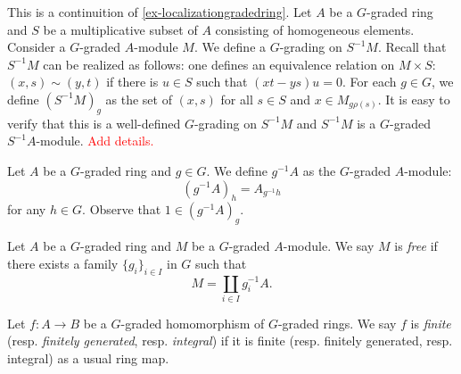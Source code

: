\begin{example}\label{ex-localizationgradedmodule}
    This is a continuition of \cref{ex-localizationgradedring}.
    Let $A$ be a $G$-graded ring and $S$ be a multiplicative subset of $A$ consisting of homogeneous elements. Consider a $G$-graded $A$-module $M$. We define a $G$-grading on $S^{-1}M$. Recall that $S^{-1}M$ can be realized as follows: one defines an equivalence relation on $M\times S$: $(x,s)\sim (y,t)$ if there is $u\in S$ such that $(xt-ys)u=0$. For each $g\in G$, we define $(S^{-1}M)_g$ as the set of $(x,s)$ for all $s\in S$ and $x\in M_{g\rho(s)}$. It is easy to verify that this is a well-defined $G$-grading on $S^{-1}M$ and $S^{-1}M$ is a $G$-graded $S^{-1}A$-module.  \textcolor{red}{Add details.}
\end{example}

\begin{example}\label{ex-twistmodule}
    Let $A$ be a $G$-graded ring and $g\in G$. We define $g^{-1}A$ as the $G$-graded $A$-module:
    \[
        (g^{-1}A)_h=A_{g^{-1}h}
    \]
    for any $h\in G$. Observe that $1\in (g^{-1}A)_g$.
\end{example}

\begin{definition}
    Let $A$ be a $G$-graded ring and $M$ be a $G$-graded $A$-module. We say $M$ is \emph{free} if there exists a family $\{g_i\}_{i\in I}$ in $G$ such that
    \[
        M=\coprod_{i\in I} g_i^{-1}A.  
    \]
\end{definition}

\begin{definition}
    Let $f:A\rightarrow B$ be a $G$-graded homomorphism of $G$-graded rings. We say $f$ is \emph{finite} (resp. \emph{finitely generated}, resp. \emph{integral}) if it is finite (resp. finitely generated, resp. integral) as a usual ring map.
\end{definition}

